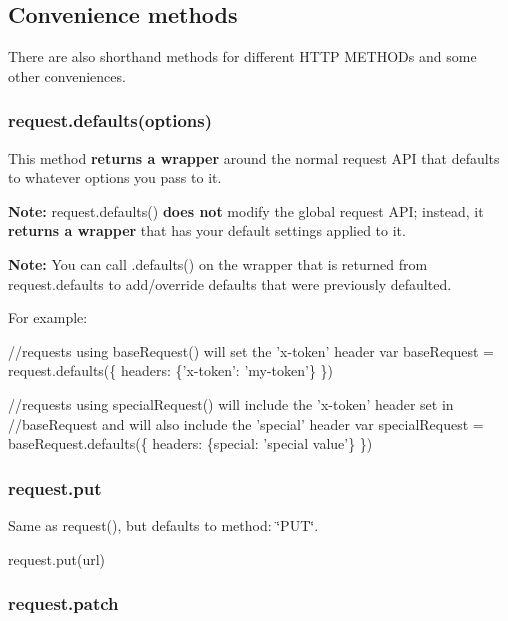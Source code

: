 \subsection*{Convenience methods}

There are also shorthand methods for different H\+T\+TP M\+E\+T\+H\+O\+Ds and some other conveniences.

\subsubsection*{request.\+defaults(options)}

This method {\bfseries returns a wrapper} around the normal request A\+PI that defaults to whatever options you pass to it.

{\bfseries Note\+:} {\ttfamily request.\+defaults()} {\bfseries does not} modify the global request A\+PI; instead, it {\bfseries returns a wrapper} that has your default settings applied to it.

{\bfseries Note\+:} You can call {\ttfamily .defaults()} on the wrapper that is returned from {\ttfamily request.\+defaults} to add/override defaults that were previously defaulted.

For example\+: 
\begin{DoxyCode}
//requests using baseRequest() will set the 'x-token' header
var baseRequest = request.defaults(\{
  headers: \{'x-token': 'my-token'\}
\})

//requests using specialRequest() will include the 'x-token' header set in
//baseRequest and will also include the 'special' header
var specialRequest = baseRequest.defaults(\{
  headers: \{special: 'special value'\}
\})
\end{DoxyCode}


\subsubsection*{request.\+put}

Same as {\ttfamily request()}, but defaults to {\ttfamily method\+: \char`\"{}\+P\+U\+T\char`\"{}}.


\begin{DoxyCode}
request.put(url)
\end{DoxyCode}


\subsubsection*{request.\+patch}

